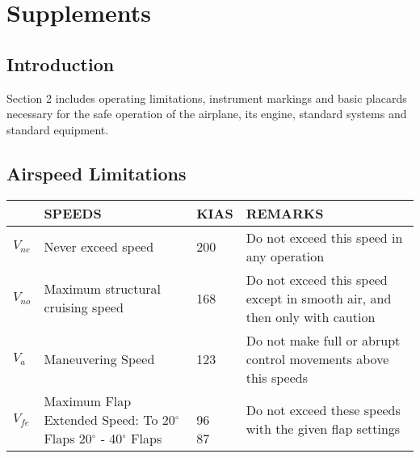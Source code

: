 \chapter{Supplements}
\thispagestyle{fancy}
\minitoc[n] %

\section{Introduction}
Section 2 includes operating limitations, instrument markings and basic placards necessary for the safe operation of the airplane, its engine, standard systems and standard equipment.

\section{Airspeed Limitations}


\begin{center}
\begin{tabular}{ |p{1cm}|p{6cm}|p{2cm}|p{5cm}| } 
 \hline
  & SPEEDS &  KIAS & REMARKS\\ 
 \hline
 $V_{ne}$ & Never exceed speed & 200 & Do not exceed this speed in any operation\\ 
 \hline
 $V_{no}$ & Maximum structural cruising speed & 168  & Do not exceed this speed except in smooth air, and then only with caution\\ 
 \hline
 $V_{a}$ & Maneuvering Speed & 123  & Do not make full or abrupt control movements above this speeds \\ 
 \hline
 $V_{fe}$  & \shortstack[l]{Maximum Flap Extended Speed: \\To 20$^{\circ}$ Flaps\\ 20$^{\circ}$ - 40$^{\circ}$ Flaps} & \shortstack[l]{\\96 \\ 87} & Do not exceed these speeds with the given flap settings \\ 
 \hline
\end{tabular}
\end{center}


